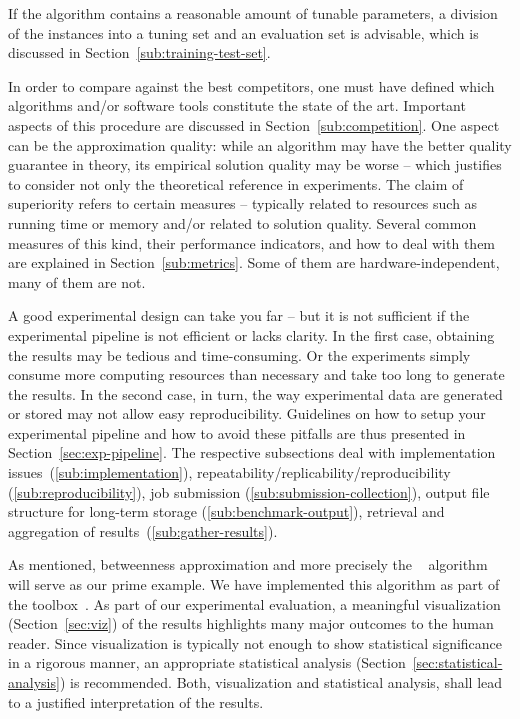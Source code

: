 \documentclass[algorithms,article,submit,moreauthors,pdftex]{Definitions/mdpi}
\newcommand{\changed}[1]{#1}
\begin{document}
If the algorithm contains a reasonable amount of tunable parameters,
a division of the instances into a tuning set and an evaluation set \changed{is} advisable,
which is discussed in Section~\ref{sub:training-test-set}.

In order to compare against the best competitors, one must have defined which algorithms and/or
software tools constitute the state of the art. Important aspects of this procedure are discussed in Section~\ref{sub:competition}. One aspect can be the approximation quality:
while an algorithm may have the better quality guarantee in theory, its empirical
solution quality may be worse -- which justifies to consider not only the theoretical reference in experiments.
%
The claim of superiority refers to certain measures -- typically related
to resources such as running time or memory and/or related to solution
quality. Several common measures of this kind, \changed{their performance indicators,}
and how to deal with them are explained in Section~\ref{sub:metrics}.
Some of them are hardware-independent, many of them are not.

A good experimental design can take you far -- but it is not sufficient if the experimental
pipeline is not efficient or lacks clarity. In the first case, obtaining the results may be tedious
and time-consuming.
%
Or the experiments simply consume more computing resources than
necessary and take too long to generate the results. In the second case, in turn, the way experimental
data are generated or stored may not allow easy reproducibility.
%
Guidelines on how to setup your experimental pipeline and how to avoid these pitfalls are thus presented
in Section~\ref{sec:exp-pipeline}. The respective subsections deal with implementation
issues~(\ref{sub:implementation}), repeatability/replicability/reproducibility (\ref{sub:reproducibility}), job submission
(\ref{sub:submission-collection}), output file structure for long-term storage (\ref{sub:benchmark-output}),
retrieval and aggregation of results~(\ref{sub:gather-results}).

As mentioned, betweenness approximation and more precisely the \kad~\cite{borassi2016kadabra}
algorithm will serve as our prime example.
We have implemented this algorithm as part of the \nwk toolbox~\cite{staudt2016networkit}.
%
As part of our experimental evaluation, a meaningful visualization (Section~\ref{sec:viz}) of the results
highlights many major outcomes to the human reader.
Since visualization is typically not enough to show statistical significance in a rigorous manner,
an appropriate statistical analysis (Section~\ref{sec:statistical-analysis}) is recommended.
Both, visualization and statistical analysis, shall lead to a justified interpretation of the results.
\end{document}
